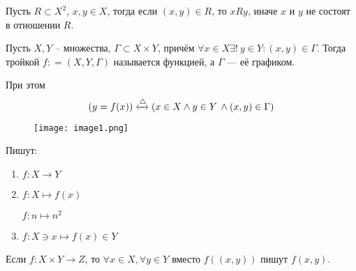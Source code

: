     \begin{example}
        Пусть $ R \subset X^2 $, $ x,y \in X $, тогда если $ (x, y) \in R $,
        то $ xRy $, иначе $ x $ и $ y $ не состоят в отношении $ R $. 
    \end{example}
    \begin{definition}
        Пусть $ X, Y $ -- множества, $ \Gamma\subset X  \times  Y$, причём $ \forall x \in X \exists 
        !\ y \in  Y: (x, y) \in \Gamma $. Тогда тройкой $ f : = \left(X, Y, \Gamma\right) $ называется
        функцией, а $ \Gamma $ --- её графиком.
    \end{definition}
    \begin{note}
        При этом \begin{equation}
            (y = f(x)) \xleftrightarrow{\triangle}\left(x \in X \land y \in Y\, \land 
            (x, y) \in \Gamma\right)
        \end{equation}
    
    \begin{figure}
        \centering
        \texttt{[image: image1.png]}
    \end{figure}
    
        Пишут: \begin{enumerate}
            \item $ f:  X \to  Y $
            \item $ f: X\mapsto f(x) $ \begin{example}
                $ f: n \mapsto n^2 $
            \end{example}
            \item $ f: X \ni x \mapsto f(x) \in Y $
        \end{enumerate}
    
        Если $ f: X \times Y \to Z $, то $ \forall x \in  X, \forall y \in  
        Y $ вместо $ f((x, y)) $ пишут $ f(x, y) $.
    \end{note}
   